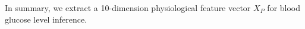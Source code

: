 In summary, we extract a 10-dimension physiological feature vector $X_P$ for blood glucose level inference.

%

%
%
%
%
%
%
%

%

